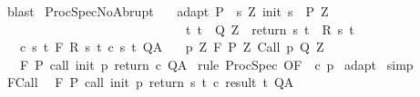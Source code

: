 \begin{isabellebody}
\isamarkupfalse%
\ blast\isanewline
{}\isamarkupfalse%
%
\endisatagproof
{\isafoldproof}%
%
\isadelimproof
\isanewline
%
\endisadelimproof
\isanewline
{}\isamarkupfalse%
\ ProcSpecNoAbrupt{\isacharcolon}\isanewline
\ \ \ adapt{\isacharcolon}\ {\isachardoublequoteopen}P\ {\isasymsubseteq}\ {\isacharbraceleft}s{\isachardot}\ {\isasymexists}Z{\isachardot}\ init\ s\ {\isasymin}\ P{\isacharprime}\ Z\ {\isasymand}\ \isanewline
\ \ \ \ \ \ \ \ \ \ \ \ \ \ \ \ \ \ \ \ \ \ \ \ \ \ \ \ \ {\isacharparenleft}{\isasymforall}t{\isachardot}\ t\ {\isasymin}\ Q{\isacharprime}\ Z\ {\isasymlongrightarrow}\ return\ s\ t\ {\isasymin}\ R\ s\ t{\isacharparenright}{\isacharbraceright}{\isachardoublequoteclose}\isanewline
\ \ \ c{\isacharcolon}\ {\isachardoublequoteopen}{\isasymforall}s\ t{\isachardot}\ {\isasymGamma}{\isacharcomma}{\isasymTheta}{\isasymturnstile}\isactrlbsub {\isacharslash}F\isactrlesub \ {\isacharparenleft}R\ s\ t{\isacharparenright}\ {\isacharparenleft}c\ s\ t{\isacharparenright}\ Q{\isacharcomma}A{\isachardoublequoteclose}\isanewline
\ \ \ p{\isacharcolon}\ {\isachardoublequoteopen}{\isasymforall}Z{\isachardot}\ {\isasymGamma}{\isacharcomma}{\isasymTheta}{\isasymturnstile}\isactrlbsub {\isacharslash}F\isactrlesub \ {\isacharparenleft}P{\isacharprime}\ Z{\isacharparenright}\ Call\ p\ {\isacharparenleft}Q{\isacharprime}\ Z{\isacharparenright}{\isacharcomma}{\isacharbraceleft}{\isacharbraceright}{\isachardoublequoteclose}\ \isanewline
\ \ \ {\isachardoublequoteopen}{\isasymGamma}{\isacharcomma}{\isasymTheta}{\isasymturnstile}\isactrlbsub {\isacharslash}F\isactrlesub \ P\ {\isacharparenleft}call\ init\ p\ return\ c{\isacharparenright}\ Q{\isacharcomma}A{\isachardoublequoteclose}\isanewline
%
\isadelimproof
%
\endisadelimproof
%
\isatagproof
{}\isamarkupfalse%
\ {\isacharparenleft}rule\ ProcSpec\ {\isacharbrackleft}OF\ {\isacharunderscore}\ c\ p{\isacharbrackright}{\isacharparenright}\isanewline
{}\isamarkupfalse%
\ adapt\isanewline
{}\isamarkupfalse%
\ simp\isanewline
{}\isamarkupfalse%
%
\endisatagproof
{\isafoldproof}%
%
\isadelimproof
\isanewline
%
\endisadelimproof
\isanewline
{}\isamarkupfalse%
\ FCall{\isacharcolon}\ \ \isanewline
{\isachardoublequoteopen}{\isasymGamma}{\isacharcomma}{\isasymTheta}{\isasymturnstile}\isactrlbsub {\isacharslash}F\isactrlesub \ P\ {\isacharparenleft}call\ init\ p\ return\ {\isacharparenleft}{\isasymlambda}s\ t{\isachardot}\ c\ {\isacharparenleft}result\ t{\isacharparenright}{\isacharparenright}{\isacharparenright}\ Q{\isacharcomma}A\isanewline

\end{isabellebody}
